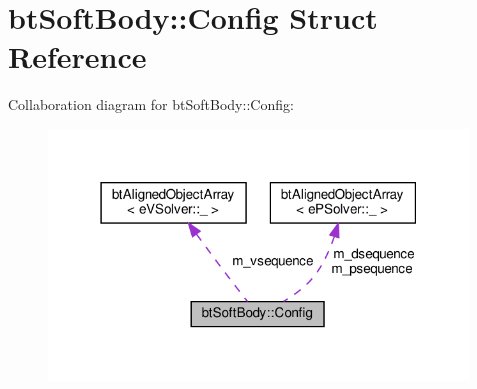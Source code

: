 \hypertarget{structbtSoftBody_1_1Config}{}\section{bt\+Soft\+Body\+:\+:Config Struct Reference}
\label{structbtSoftBody_1_1Config}


Collaboration diagram for bt\+Soft\+Body\+:\+:Config\+:
\nopagebreak
\begin{figure}[H]
\begin{center}
\leavevmode
\includegraphics[width=316pt]{structbtSoftBody_1_1Config__coll__graph}
\end{center}
\end{figure}
